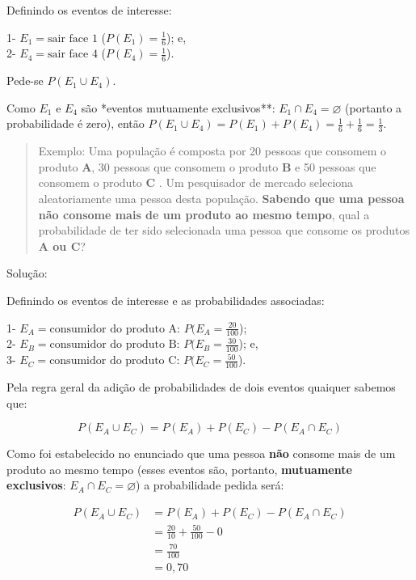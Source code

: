 \documentclass[
]{book}
\begin{document}
Definindo os eventos de interesse:

1- \(E_{1}=\text{sair face 1}\) (\(P(E_{1})=\frac{1}{6}\)); e,\\
2- \(E_{4}=\text{sair face 4}\) (\(P(E_{4})=\frac{1}{6}\)).

Pede-se \(P(E_{1} \cup E_{4})\).

Como \(E_{1}\) e \(E_{4}\) são *eventos mutuamente exclusivos**: \(E_{1} \cap E_{4}=\varnothing\) (portanto a probabilidade é zero), então \(P(E_{1} \cup E_{4}) = P(E_{1}) + P(E_{4}) = \frac{1}{6} + \frac{1}{6}= \frac{1}{3}\).

\begin{quote}
Exemplo: Uma população é composta por 20 pessoas que consomem o produto \textbf{A}, 30 pessoas que consomem o produto \textbf{B} e 50 pessoas que consomem o produto \textbf{C} . Um pesquisador de mercado seleciona aleatoriamente uma pessoa desta população. \textbf{Sabendo que uma pessoa não consome mais de um produto ao mesmo tempo}, qual a probabilidade de ter sido selecionada uma pessoa que consome os produtos \textbf{A ou C}?
\end{quote}

Solução:

Definindo os eventos de interesse e as probabilidades associadas:

1- \(E_{A}=\text{consumidor do produto A}\): \(P(E_{A}=\frac{20}{100}\));\\
2- \(E_{B}=\text{consumidor do produto B}\): \(P(E_{B}=\frac{30}{100}\)); e,\\
3- \(E_{C}=\text{consumidor do produto C}\): \(P(E_{C}=\frac{50}{100}\)).

Pela regra geral da adição de probabilidades de dois eventos quaiquer sabemos que:

\[
P(E_{A} \cup E_{C}) = P(E_{A}) + P(E_{C}) - P(E_{A} \cap E_{C})
\]

Como foi estabelecido no enunciado que uma pessoa \textbf{não} consome mais de um produto ao mesmo tempo (esses eventos são, portanto, \textbf{mutuamente exclusivos}: \(E_{A} \cap E_{C}=\varnothing\)) a probabilidade pedida será:

\begin{align*}
P(E_{A} \cup E_{C}) & = P(E_{A}) + P(E_{C}) - P(E_{A} \cap E_{C}) \\
                    & = \frac{20}{10} + \frac{50}{100} - 0 \\
                    & =  \frac{70}{100} \\
                    & =  0,70    
\end{align*}
\end{document}
